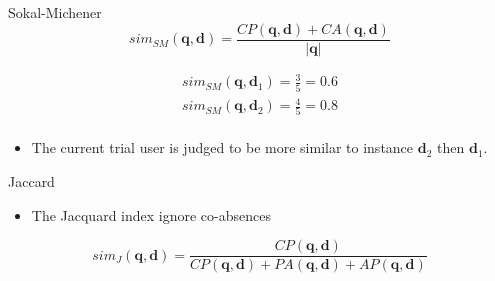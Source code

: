 \documentclass[xcolor={table}]{beamer}
\begin{document}
 \begin{frame} 
\begin{block}{Sokal-Michener}
\begin{equation}
sim_{SM}(\mathbf{q},\mathbf{d})=\frac{CP(\mathbf{q},\mathbf{d})+CA(\mathbf{q},\mathbf{d})}{|\mathbf{q}|}
\label{eq:sokal-michener}
\end{equation}
\end{block}
\begin{example}
\begin{eqnarray*}
sim_{SM}(\mathbf{q},\mathbf{d}_1)=\frac{3}{5}=0.6\\
sim_{SM}(\mathbf{q},\mathbf{d}_2)=\frac{4}{5}=0.8\\
\end{eqnarray*}
\begin{itemize}
	\item The current trial user is judged to be more similar to instance $\mathbf{d}_2$ then $\mathbf{d}_1$.
\end{itemize}
\end{example}
\end{frame} 



 \begin{frame} 
\begin{block}{Jaccard}
\begin{itemize}
	\item The Jacquard index ignore co-absences
\end{itemize}
\begin{equation}
sim_{J}(\mathbf{q},\mathbf{d})=\frac{CP(\mathbf{q},\mathbf{d})}{CP(\mathbf{q},\mathbf{d})+PA(\mathbf{q},\mathbf{d})+AP(\mathbf{q},\mathbf{d})}
\label{eq:jaccard}
\end{equation}
\end{block}
\end{frame} 
\end{document}
